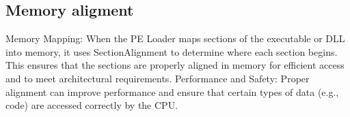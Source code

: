 \subsection{Memory aligment}

Memory Mapping: When the PE Loader maps sections of the executable or DLL into memory, it uses SectionAlignment to determine where each section begins. This ensures that the sections are properly aligned in memory for efficient access and to meet architectural requirements.
Performance and Safety: Proper alignment can improve performance and ensure that certain types of data (e.g., code) are accessed correctly by the CPU.